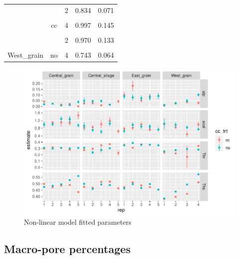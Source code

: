 \documentclass[
]{article}
\begin{document}
\begin{table}[H]
\begin{tabular}[t]{ccccc}
 &  & 2 & 0.834 & 0.071\\

\cellcolor{gray!6}{} & \cellcolor{gray!6}{} & \cellcolor{gray!6}{3} & \cellcolor{gray!6}{0.488} & \cellcolor{gray!6}{0.175}\\

 & \multirow{-4}{*}{\centering\arraybackslash cc} & 4 & 0.997 & 0.145\\

\cellcolor{gray!6}{} & \cellcolor{gray!6}{} & \cellcolor{gray!6}{1} & \cellcolor{gray!6}{1.039} & \cellcolor{gray!6}{0.268}\\

 &  & 2 & 0.970 & 0.133\\

\cellcolor{gray!6}{} & \cellcolor{gray!6}{} & \cellcolor{gray!6}{3} & \cellcolor{gray!6}{0.837} & \cellcolor{gray!6}{0.110}\\

\multirow{-8}{*}{\centering\arraybackslash West\_grain} & \multirow{-4}{*}{\centering\arraybackslash no} & 4 & 0.743 & 0.064\\
\bottomrule
\end{tabular}
\end{table}

\begin{figure}
\centering
\includegraphics{rmd-supp-mat_files/figure-latex/paramsalp-1.pdf}
\caption{Non-linear model fitted parameters}
\end{figure}

\hypertarget{macro-pore-percentages}{%
\subsection{Macro-pore percentages}\label{macro-pore-percentages}}
\end{document}
